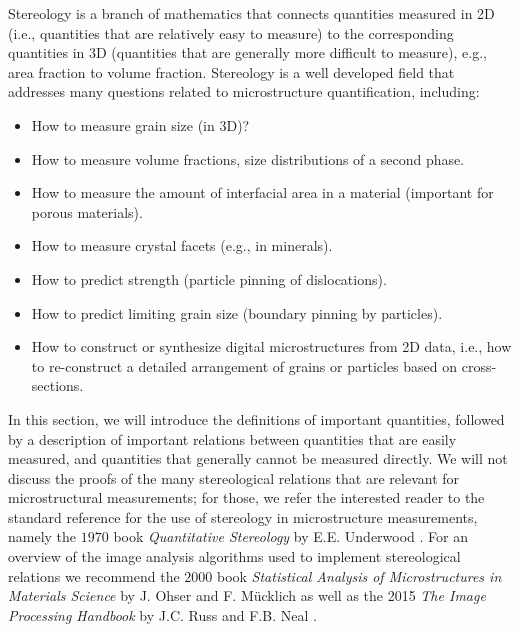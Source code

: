 Stereology is a branch of mathematics that connects quantities measured in 2D (i.e., quantities that are relatively easy to measure) to the corresponding quantities in 3D (quantities that are generally more difficult to measure), e.g., area fraction to volume fraction. Stereology is a well developed field that addresses many questions related to microstructure quantification, including:
\begin{itemize}
\item How to measure grain size (in 3D)?
\item How to measure volume fractions, size distributions of a second phase.
\item How to measure the amount of interfacial area in a material (important for porous materials).
\item How to measure crystal facets (e.g., in minerals).
\item How to predict strength (particle pinning of dislocations).
\item How to predict limiting grain size (boundary pinning by particles).
\item How to construct or synthesize digital microstructures from 2D data, i.e., how to re-construct a detailed arrangement of grains or particles based on cross-sections.
\end{itemize}
In this section, we will introduce the definitions of important quantities, followed by a description of important relations between quantities that are easily measured, and quantities that generally cannot be measured directly.  We will not discuss the proofs of the many stereological relations that are relevant for microstructural measurements; for those, we refer the interested reader to the standard reference for the use of stereology in microstructure measurements, namely the $1970$ book \textit{Quantitative Stereology} by E.E. Underwood \cite{underwood1970a}. For an overview of the image analysis algorithms used to implement stereological relations we recommend the $2000$ book \textit{Statistical Analysis of Microstructures in Materials Science} by J. Ohser and F. M{\"u}cklich \cite{ohser2000a} as well as the 2015 \textit{The Image Processing Handbook} by J.C. Russ and F.B. Neal \cite{russ2015a}.

